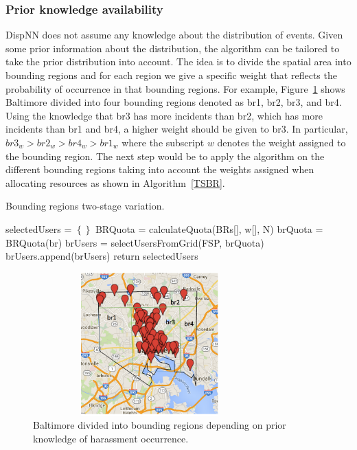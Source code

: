 \documentclass{acm_proc_article-sp}
\begin{document}
\subsubsection{Prior knowledge availability}
DispNN does not assume any knowledge about the distribution of events. Given some prior information about the distribution, the algorithm can be tailored to take the prior distribution into account. The idea is to divide the spatial area into bounding regions and for each region we give a specific weight that reflects the probability of occurrence in that bounding regions.
For example, Figure~\ref{fig: BaltimoreRegions} shows Baltimore divided into four bounding regions denoted as br1, br2, br3, and br4. Using the knowledge that br3 has more incidents than br2, which has more incidents than br1 and br4, a higher weight should be given to br3. In particular, $br3_w > br2_w> br4_w> br1_w$ where the subscript $w$ denotes the weight assigned to the bounding region. The next step would be to apply the algorithm on the different bounding regions taking into account the weights assigned when allocating resources as shown in Algorithm~\ref{TSBR}.
\begin{algorithm}
\caption{Bounding regions two-stage variation.}
\label{TSBR}
\begin{algorithmic}[1]
    \State selectedUsers = $\left\{\right\}$
     \State BRQuota = calculateQuota(BRs[], w[], N)
      \State brQuota = BRQuota(br)
    \State brUsers = selectUsersFromGrid(FSP, brQuota)
    \State brUsers.append(brUsers)
  \EndFor
\State return {selectedUsers}
\EndFunction
\end{algorithmic}
\end{algorithm}
\begin{figure}[!h]
\centering
\includegraphics[width=9cm ,height=5.5cm]{figuresPng/BaltimoreBr.png}
\caption{Baltimore divided into bounding regions depending on prior knowledge of harassment occurrence.}
\label{fig: BaltimoreRegions}
\end{figure}
\end{document}
